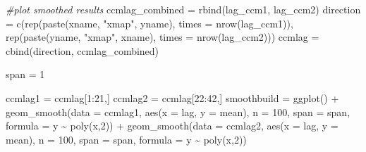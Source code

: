 \documentclass[
]{article}
\newenvironment{Shaded}{\begin{snugshade}}{\end{snugshade}}
\newcommand{\AttributeTok}[1]{\textcolor[rgb]{0.77,0.63,0.00}{#1}}
\newcommand{\CommentTok}[1]{\textcolor[rgb]{0.56,0.35,0.01}{\textit{#1}}}
\newcommand{\DecValTok}[1]{\textcolor[rgb]{0.00,0.00,0.81}{#1}}
\newcommand{\FunctionTok}[1]{\textcolor[rgb]{0.00,0.00,0.00}{#1}}
\newcommand{\NormalTok}[1]{#1}
\newcommand{\OtherTok}[1]{\textcolor[rgb]{0.56,0.35,0.01}{#1}}
\newcommand{\SpecialCharTok}[1]{\textcolor[rgb]{0.00,0.00,0.00}{#1}}
\newcommand{\StringTok}[1]{\textcolor[rgb]{0.31,0.60,0.02}{#1}}
\begin{document}
\begin{Shaded}
\begin{Highlighting}[]
\CommentTok{\#plot smoothed results}
\NormalTok{ccmlag\_combined }\OtherTok{=} \FunctionTok{rbind}\NormalTok{(lag\_ccm1, lag\_ccm2)}
\NormalTok{direction }\OtherTok{=} \FunctionTok{c}\NormalTok{(}\FunctionTok{rep}\NormalTok{(}\FunctionTok{paste}\NormalTok{(xname, }\StringTok{"xmap"}\NormalTok{, yname), }\AttributeTok{times =} \FunctionTok{nrow}\NormalTok{(lag\_ccm1)), }\FunctionTok{rep}\NormalTok{(}\FunctionTok{paste}\NormalTok{(yname, }\StringTok{"xmap"}\NormalTok{, xname), }\AttributeTok{times =} \FunctionTok{nrow}\NormalTok{(lag\_ccm2)))}
\NormalTok{ccmlag }\OtherTok{=} \FunctionTok{cbind}\NormalTok{(direction, ccmlag\_combined)}

\NormalTok{span }\OtherTok{=} \DecValTok{1}

\NormalTok{ccmlag1 }\OtherTok{=}\NormalTok{ ccmlag[}\DecValTok{1}\SpecialCharTok{:}\DecValTok{21}\NormalTok{,]}
\NormalTok{ccmlag2 }\OtherTok{=}\NormalTok{ ccmlag[}\DecValTok{22}\SpecialCharTok{:}\DecValTok{42}\NormalTok{,]}
\NormalTok{smoothbuild }\OtherTok{=} \FunctionTok{ggplot}\NormalTok{() }\SpecialCharTok{+}
  \FunctionTok{geom\_smooth}\NormalTok{(}\AttributeTok{data =}\NormalTok{ ccmlag1, }\FunctionTok{aes}\NormalTok{(}\AttributeTok{x =}\NormalTok{ lag, }\AttributeTok{y =}\NormalTok{ mean), }\AttributeTok{n =} \DecValTok{100}\NormalTok{, }\AttributeTok{span =}\NormalTok{ span, }\AttributeTok{formula =}\NormalTok{ y }\SpecialCharTok{\textasciitilde{}} \FunctionTok{poly}\NormalTok{(x,}\DecValTok{2}\NormalTok{)) }\SpecialCharTok{+}
  \FunctionTok{geom\_smooth}\NormalTok{(}\AttributeTok{data =}\NormalTok{ ccmlag2, }\FunctionTok{aes}\NormalTok{(}\AttributeTok{x =}\NormalTok{ lag, }\AttributeTok{y =}\NormalTok{ mean), }\AttributeTok{n =} \DecValTok{100}\NormalTok{, }\AttributeTok{span =}\NormalTok{ span, }\AttributeTok{formula =}\NormalTok{ y }\SpecialCharTok{\textasciitilde{}} \FunctionTok{poly}\NormalTok{(x,}\DecValTok{2}\NormalTok{)) }
  

\end{Highlighting}
\end{Shaded}
\end{document}
